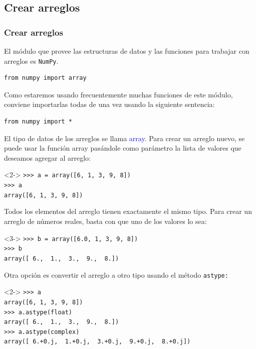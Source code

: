 \subsection{Crear arreglos}
\begin{frame}[fragile]
\frametitle{Crear arreglos}
El m\'{o}dulo que provee las estructuras de datos y las funciones para trabajar con arreglos es \texttt{NumPy}.
\begin{verbatim}
from numpy import array
\end{verbatim}
Como estaremos usando frecuentemente muchas funciones de este m\'{o}dulo, conviene importarlas todas de una vez usando la siguiente sentencia:
\begin{verbatim}
from numpy import *
\end{verbatim}
\end{frame}
\begin{frame}[fragile]
El tipo de datos de los arreglos se llama \textcolor{blue}{array}. Para crear un arreglo nuevo, se puede usar la funci\'{o}n array pas\'{a}ndole como par\'{a}metro la lista de valores que deseamos agregar al arreglo:
\begin{exampleblock}{}<2->
\pause
\verb|>>> a = array([6, 1, 3, 9, 8])| \\
\pause
\verb|>>> a|  \\
\pause
\verb|array([6, 1, 3, 9, 8])|
\end{exampleblock}
\pause
Todos los elementos del arreglo tienen exactamente el mismo tipo. Para crear un arreglo de n\'{u}meros reales, basta con que uno de los valores lo sea:
\pause
\begin{exampleblock}{}<3->
\pause
\verb|>>> b = array([6.0, 1, 3, 9, 8])| \\
\pause
\verb|>>> b| \\
\pause
\verb|array([ 6.,  1.,  3.,  9.,  8.])| 
\end{exampleblock}
\end{frame}
\begin{frame}[fragile]
Otra opci\'{o}n es convertir el arreglo a otro tipo usando el m\'{e}todo \texttt{astype:}
\begin{exampleblock}{}<2->
\verb|>>> a| \\
\pause
\verb|array([6, 1, 3, 9, 8])| \\
\pause
\verb|>>> a.astype(float)| \\
\pause
\verb|array([ 6.,  1.,  3.,  9.,  8.])| \\
\pause
\verb|>>> a.astype(complex)| \\
\pause
\verb|array([ 6.+0.j,  1.+0.j,  3.+0.j,  9.+0.j,  8.+0.j])|
\end{exampleblock}
\end{frame}
